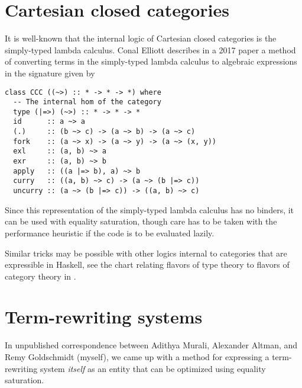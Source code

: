 \documentclass[11pt]{report}
\newcommand{\sfixme}[0]{%
  \begin{minipage}[c]{3.5em}%
  \todo[color=green!40,inline]{\textsc{fixme}}%
  \end{minipage}}
\begin{document}
\section{Cartesian closed categories}
\label{sec:cccs}

It is well-known that the internal logic of Cartesian closed categories is
the simply-typed lambda calculus. Conal Elliott describes in a 2017 paper
\cite{elliott-2017} a method of converting terms in the simply-typed lambda
calculus to algebraic expressions in the signature given by

\vspace{-0.5em}
\begin{verbatim}
class CCC ((~>) :: * -> * -> *) where
  -- The internal hom of the category
  type (|=>) (~>) :: * -> * -> *
  id      :: a ~> a
  (.)     :: (b ~> c) -> (a ~> b) -> (a ~> c)
  fork    :: (a ~> x) -> (a ~> y) -> (a ~> (x, y))
  exl     :: (a, b) ~> a
  exr     :: (a, b) ~> b
  apply   :: ((a |=> b), a) ~> b
  curry   :: ((a, b) ~> c) -> (a ~> (b |=> c))
  uncurry :: (a ~> (b |=> c)) -> ((a, b) ~> c)
\end{verbatim}

Since this representation of the simply-typed lambda calculus has no binders, it
can be used with equality saturation, though care has to be taken with the
performance heuristic if the code is to be evaluated lazily.

Similar tricks may be possible with other logics internal to categories that
are expressible in Haskell, see the chart relating flavors of type theory to
flavors of category theory in
\cite{nlab-relation-between-type-theory-and-category-theory}.

%
%

\section{Term-rewriting systems}
\label{sec:term-rewriting-systems}

In unpublished correspondence between Adithya Murali, Alexander Altman, and
Remy Goldschmidt (myself), we came up with a method for expressing a
term-rewriting system \textit{itself} as an entity that can be optimized using
equality saturation.
\end{document}
